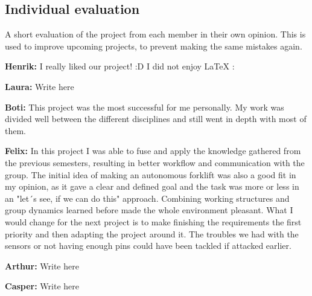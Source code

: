 \documentclass[../report.tex]{subfiles}
\begin{document}
\subsection{Individual evaluation}
A short evaluation of the project from each member in their own opinion. This is used to improve
upcoming projects, to prevent making the same mistakes again.

\textbf{Henrik:}
I really liked our project! :D I did not enjoy LaTeX :%

\textbf{Laura:}
Write here

\textbf{Boti:}
This project was the most successful for me personally. My work was divided well between the different disciplines
and still went in depth with most of them.

\textbf{Felix:}
In this project I was able to fuse and apply the knowledge gathered from the previous semesters, resulting in better 
workflow and communication with the group. The initial idea of making an autonomous forklift was also a good fit 
in my opinion, as it gave a clear and defined goal and the task was more or less in an "let´s see, if we can do this" 
approach. Combining working structures and group dynamics learned before made the whole environment pleasant.  What I would 
change for the next project is to make finishing the requirements the first priority and then adapting the project around it. 
The troubles we had with the sensors or not having enough pins could have been tackled if attacked earlier.



\textbf{Arthur:}
Write here

\textbf{Casper:}
Write here
\end{document}
